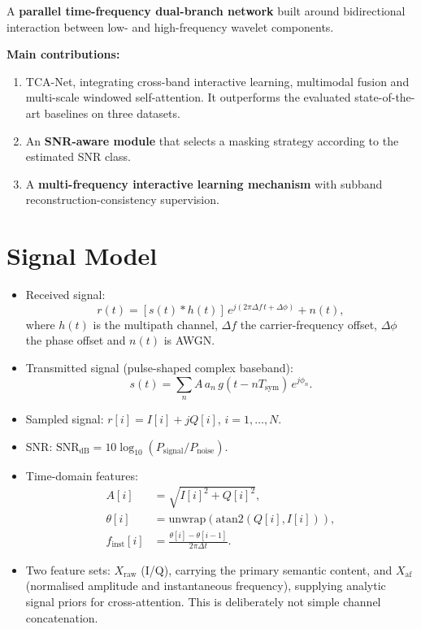 \documentclass[11pt,a4paper]{article}
\begin{document}
A \textbf{parallel time-frequency dual-branch network} built around bidirectional interaction between low- and high-frequency wavelet components.

\textbf{Main contributions:}
\begin{enumerate}
  \item TCA-Net, integrating cross-band interactive learning, multimodal fusion and multi-scale windowed self-attention. It outperforms the evaluated state-of-the-art baselines on three datasets.
  \item An \textbf{SNR-aware module} that selects a masking strategy according to the estimated SNR class.
  \item A \textbf{multi-frequency interactive learning mechanism} with subband reconstruction-consistency supervision.
\end{enumerate}

\section{Signal Model}

\begin{itemize}
  \item Received signal:
  \[ r(t) = [s(t) * h(t)]\, e^{j(2\pi \Delta f\, t + \Delta\phi)} + n(t), \]
  where $h(t)$ is the multipath channel, $\Delta f$ the carrier-frequency offset, $\Delta\phi$ the phase offset and $n(t)$ is AWGN.
  \item Transmitted signal (pulse-shaped complex baseband):
  \[ s(t) = \sum_n A\, a_n\, g(t - nT_{\text{sym}})\, e^{j\phi_n}. \]
  \item Sampled signal: $r[i] = I[i] + jQ[i]$, $i = 1,\dots,N$.
  \item SNR: $\text{SNR}_{\text{dB}} = 10\log_{10}(P_{\text{signal}}/P_{\text{noise}})$.
  \item Time-domain features:
  \begin{align*}
    A[i] &= \sqrt{I[i]^2 + Q[i]^2},\\
    \theta[i] &= \text{unwrap}(\text{atan2}(Q[i], I[i])),\\
    f_{\text{inst}}[i] &= \frac{\theta[i] - \theta[i-1]}{2\pi \Delta t}.
  \end{align*}
  \item Two feature sets: $X_{\text{raw}}$ (I/Q), carrying the primary semantic content, and $X_{\text{af}}$ (normalised amplitude and instantaneous frequency), supplying analytic signal priors for cross-attention. This is deliberately not simple channel concatenation.
\end{itemize}
\end{document}
